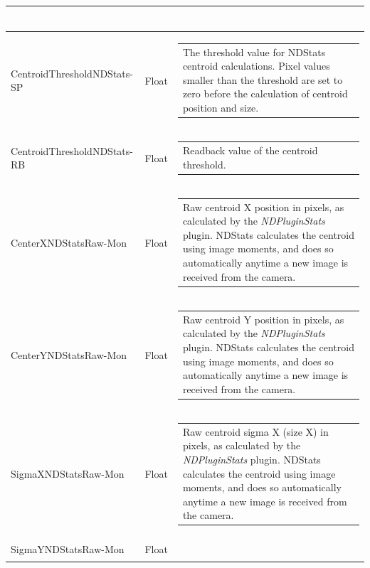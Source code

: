 \documentclass[openany]{article}
\begin{document}
\begin{longtable}{| m{3.0cm} m{4.5cm}  m{7.0cm} |}
\begin{tabular}{@{}m{6cm}@{}}
            \end{tabular} \hypertarget{pv:centroid-threshold-ndstats}{}\\ \hline
        CentroidThresholdNDStats-SP & Float & \begin{tabular}{@{}m{6cm}@{}}
                The threshold value for NDStats centroid calculations. Pixel values smaller than the threshold are set to zero before the calculation of centroid position and size.
            \end{tabular} \\ \hline
        CentroidThresholdNDStats-RB & Float & \begin{tabular}{@{}m{6cm}@{}}
                Readback value of the centroid threshold.
            \end{tabular} \hypertarget{pv:center-x-ndstats-raw}{}\\ \hline
        CenterXNDStatsRaw-Mon & Float & \begin{tabular}{@{}m{6cm}@{}}
                Raw centroid X position in pixels, as calculated by the \emph{NDPluginStats} plugin. NDStats calculates the centroid using image moments, and does so automatically anytime a new image is received from the camera.
            \end{tabular} \hypertarget{pv:center-y-ndstats-raw}{}\\ \hline
        CenterYNDStatsRaw-Mon & Float & \begin{tabular}{@{}m{6cm}@{}}
                Raw centroid Y position in pixels, as calculated by the \emph{NDPluginStats} plugin. NDStats calculates the centroid using image moments, and does so automatically anytime a new image is received from the camera.
            \end{tabular} \hypertarget{pv:sigma-x-ndstats-raw}{}\\ \hline
        SigmaXNDStatsRaw-Mon & Float & \begin{tabular}{@{}m{6cm}@{}}
                Raw centroid sigma X (size X) in pixels, as calculated by the \emph{NDPluginStats} plugin. NDStats calculates the centroid using image moments, and does so automatically anytime a new image is received from the camera.
            \end{tabular} \hypertarget{pv:sigma-y-ndstats-raw}{}\\ \hline
        SigmaYNDStatsRaw-Mon & Float & \begin{tabular}{@{}m{6cm}@{}}

\end{tabular}
\end{longtable}
\end{document}
